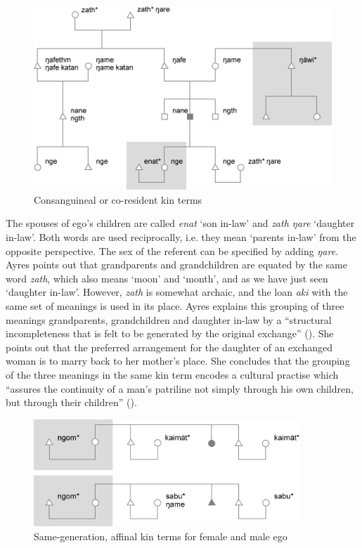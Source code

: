 \begin{figure}
  
  \includegraphics[width=12cm]{figures/kinship1.png}
  \caption[Consanguineal or co-resident kin terms]{Consanguineal or co-resident kin terms}\label{fig:kinship1}
\end{figure}

The spouses of ego's children are called \emph{enat} `son in-law' and \emph{zath ŋare} `daughter in-law'. Both words are used reciprocally, i.e. they mean `parents in-law' from the opposite perspective. The sex of the referent can be specified by adding \emph{ŋare}. Ayres points out that grandparents and grandchildren are equated by the same word \emph{zath}, which also means `moon' and `month', and as we have just seen `daughter in-law'. However, \emph{zath} is somewhat archaic, and the  loan \emph{aki} with the same set of meanings is used in its place. Ayres explains this grouping of three meanings \textendash{} grandparents, grandchildren and daughter in-law \textendash{} by a ``structural incompleteness that is felt to be generated by the original exchange'' (\citeyear[226]{Ayres:ws}). She points out that the preferred arrangement for the daughter of an exchanged woman is to marry back to her mother's place. She concludes that the grouping of the three meanings in the same kin term encodes a cultural practise which ``assures the continuity of a man's patriline not simply through his own children, but through their children'' (\citeyear[227]{Ayres:ws}).

\begin{figure}
  
  \includegraphics[width=10cm]{figures/kinship2.png}
  \caption[Same-generation, affinal kin terms for female and male ego]{Same-generation, affinal kin terms for female and male ego}\label{fig:kinship2}
\end{figure}

